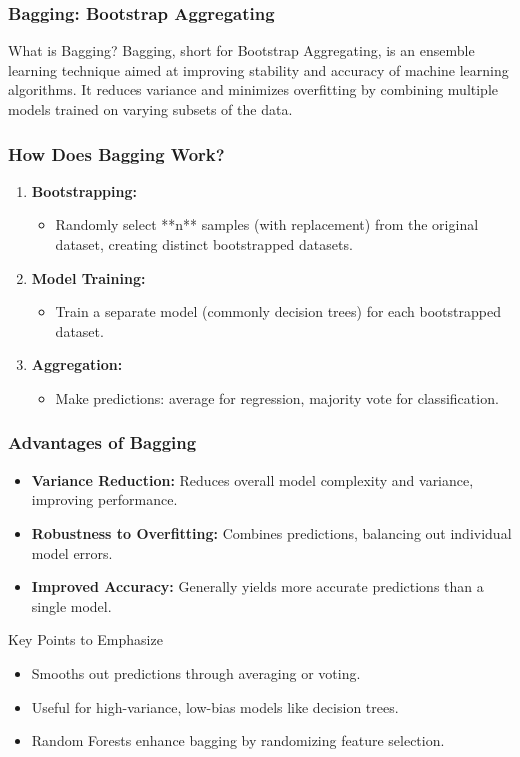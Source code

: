 \documentclass[aspectratio=169]{beamer}
\begin{document}
\begin{frame}[fragile]
  \frametitle{Bagging: Bootstrap Aggregating}
  \begin{block}{What is Bagging?}
    Bagging, short for Bootstrap Aggregating, is an ensemble learning technique aimed at improving stability and accuracy of machine learning algorithms. It reduces variance and minimizes overfitting by combining multiple models trained on varying subsets of the data.
  \end{block}
\end{frame}

\begin{frame}[fragile]
  \frametitle{How Does Bagging Work?}
  \begin{enumerate}
    \item \textbf{Bootstrapping:}
    \begin{itemize}
      \item Randomly select **n** samples (with replacement) from the original dataset, creating distinct bootstrapped datasets.
    \end{itemize}

    \item \textbf{Model Training:}
    \begin{itemize}
      \item Train a separate model (commonly decision trees) for each bootstrapped dataset.
    \end{itemize}

    \item \textbf{Aggregation:}
    \begin{itemize}
      \item Make predictions: average for regression, majority vote for classification.
    \end{itemize}
  \end{enumerate}
\end{frame}

\begin{frame}[fragile]
  \frametitle{Advantages of Bagging}
  \begin{itemize}
    \item \textbf{Variance Reduction:} Reduces overall model complexity and variance, improving performance.
    \item \textbf{Robustness to Overfitting:} Combines predictions, balancing out individual model errors.
    \item \textbf{Improved Accuracy:} Generally yields more accurate predictions than a single model.
  \end{itemize}
  \begin{block}{Key Points to Emphasize}
    \begin{itemize}
      \item Smooths out predictions through averaging or voting.
      \item Useful for high-variance, low-bias models like decision trees.
      \item Random Forests enhance bagging by randomizing feature selection.
    \end{itemize}
  \end{block}
\end{frame}
\end{document}
